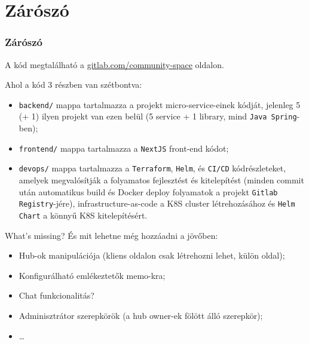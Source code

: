 \section{Zárószó}

\begin{frame}
    \frametitle{Zárószó}

    A kód megtalálható a \href{https://gitlab.com/rockdonald2/community-space}{gitlab.com/community-space} oldalon.

    \medbreak

    Ahol a kód 3 részben van szétbontva:
    \begin{itemize}
        \small
        \item \texttt{backend/} mappa tartalmazza a projekt micro-service-einek kódját, jelenleg 5 (+ 1) ilyen projekt van ezen belül (5 service + 1 library, mind \texttt{Java Spring}-ben);
        \item \texttt{frontend/} mappa tartalmazza a \texttt{NextJS} front-end kódot;
        \item \texttt{devops/} mappa tartalmazza a \texttt{Terraform}, \texttt{Helm}, és \texttt{CI/CD} kódrészleteket, amelyek megvalósítják a folyamatos fejlesztést és kitelepítést (minden commit után automatikus build és Docker deploy folyamatok a projekt \texttt{Gitlab Registry}-jére), infrastructure-as-code a K8S cluster létrehozásához és \texttt{Helm Chart} a könnyű K8S kitelepítésért.
    \end{itemize}

    \medbreak

    What's missing? És mit lehetne még hozzáadni a jövőben:
    \begin{itemize}
        \small
        \item Hub-ok manipulációja (kliens oldalon csak létrehozni lehet, külön oldal);
        \item Konfigurálható emlékeztetők memo-kra;
        \item Chat funkcionalitás?
        \item Adminisztrátor szerepkörök (a hub owner-ek fölött álló szerepkör);
        \item \dots
    \end{itemize}

\end{frame}